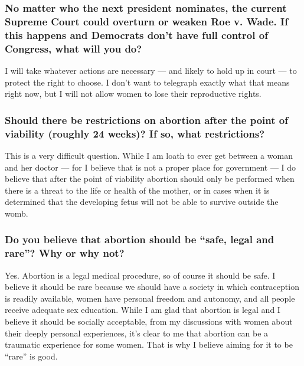 \hypertarget{no-matter-who-the-next-president-nominates-the-current-supreme-court-could-overturn-or-weaken-roe-v-wade-if-this-happens-and-democrats-dont-have-full-control-of-congress-what-will-you-do-5}{%
\subsubsection{No matter who the next president nominates, the current
Supreme Court could overturn or weaken Roe v. Wade. If this happens and
Democrats don't have full control of Congress, what will you
do?}\label{no-matter-who-the-next-president-nominates-the-current-supreme-court-could-overturn-or-weaken-roe-v-wade-if-this-happens-and-democrats-dont-have-full-control-of-congress-what-will-you-do-5}}

I will take whatever actions are necessary --- and likely to hold up in
court --- to protect the right to choose. I don't want to telegraph
exactly what that means right now, but I will not allow women to lose
their reproductive rights.

\hypertarget{should-there-be-restrictions-on-abortion-after-the-point-of-viability-roughly-24-weeks-if-so-what-restrictions-5}{%
\subsubsection{Should there be restrictions on abortion after the point
of viability (roughly 24 weeks)? If so, what
restrictions?}\label{should-there-be-restrictions-on-abortion-after-the-point-of-viability-roughly-24-weeks-if-so-what-restrictions-5}}

This is a very difficult question. While I am loath to ever get between
a woman and her doctor --- for I believe that is not a proper place for
government --- I do believe that after the point of viability abortion
should only be performed when there is a threat to the life or health of
the mother, or in cases when it is determined that the developing fetus
will not be able to survive outside the womb.

\hypertarget{do-you-believe-that-abortion-should-be-safe-legal-and-rare-why-or-why-not-5}{%
\subsubsection{Do you believe that abortion should be ``safe, legal and
rare''? Why or why
not?}\label{do-you-believe-that-abortion-should-be-safe-legal-and-rare-why-or-why-not-5}}

Yes. Abortion is a legal medical procedure, so of course it should be
safe. I believe it should be rare because we should have a society in
which contraception is readily available, women have personal freedom
and autonomy, and all people receive adequate sex education. While I am
glad that abortion is legal and I believe it should be socially
acceptable, from my discussions with women about their deeply personal
experiences, it's clear to me that abortion can be a traumatic
experience for some women. That is why I believe aiming for it to be
``rare'' is good.

